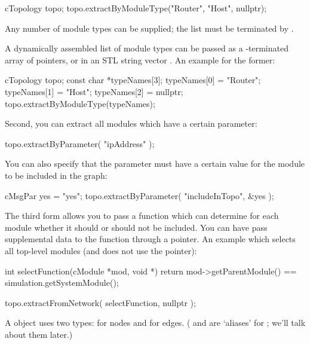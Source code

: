 \begin{cpp}
cTopology topo;
topo.extractByModuleType("Router", "Host", nullptr);
\end{cpp}

Any number of module types can be supplied; the list must be terminated by .

A dynamically assembled list of module types can be passed as a
-terminated array of  pointers, or
in an STL string vector .
An example for the former:

\begin{cpp}
cTopology topo;
const char *typeNames[3];
typeNames[0] = "Router";
typeNames[1] = "Host";
typeNames[2] = nullptr;
topo.extractByModuleType(typeNames);
\end{cpp}

Second, you can extract all modules which have a certain parameter:

\begin{cpp}
topo.extractByParameter( "ipAddress" );
\end{cpp}

You can also specify that the parameter must have a certain value
for the module to be included in the graph:

\begin{cpp}
cMsgPar yes = "yes";
topo.extractByParameter( "includeInTopo", &yes );
\end{cpp}

The third form allows you to pass a function which can determine for
each module whether it should or should not be included.  You can have
 pass supplemental data to the function through a
 pointer. An example which selects all top-level modules (and
does not use the  pointer):

\begin{cpp}
int selectFunction(cModule *mod, void *)
{
  return mod->getParentModule() == simulation.getSystemModule();
}

topo.extractFromNetwork( selectFunction, nullptr );
\end{cpp}

%
%

A  object uses two types:  for
nodes and  for edges. ( and
 are `aliases' for ; we'll
talk about them later.)

